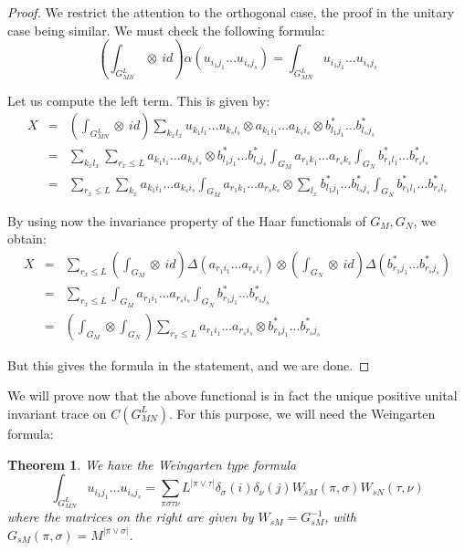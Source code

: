\documentclass[12pt]{amsbook}
\newtheorem{theorem}{Theorem}[chapter]
\begin{document}
\begin{proof}
We restrict the attention to the orthogonal case, the proof in the unitary case being similar. We must check the following formula:
$$\left(\int_{G_{MN}^L}\!\otimes\ id\right)\alpha(u_{i_1j_1}\ldots u_{i_sj_s})=\int_{G_{MN}^L}u_{i_1j_1}\ldots u_{i_sj_s}$$

Let us compute the left term. This is given by:
\begin{eqnarray*}
X
&=&\left(\int_{G_{MN}^L}\!\otimes\ id\right)\sum_{k_xl_x}u_{k_1l_1}\ldots u_{k_sl_s}\otimes a_{k_1i_1}\ldots a_{k_si_s}\otimes b_{l_1j_1}^*\ldots b_{l_sj_s}^*\\
&=&\sum_{k_xl_x}\sum_{r_x\leq L}a_{k_1i_1}\ldots a_{k_si_s}\otimes b_{l_1j_1}^*\ldots b_{l_sj_s}^*\int_{G_M}a_{r_1k_1}\ldots a_{r_sk_s}\int_{G_N}b_{r_1l_1}^*\ldots b_{r_sl_s}^*\\
&=&\sum_{r_x\leq L}\sum_{k_x}a_{k_1i_1}\ldots a_{k_si_s}\int_{G_M}a_{r_1k_1}\ldots a_{r_sk_s}
\otimes\sum_{l_x}b_{l_1j_1}^*\ldots b_{l_sj_s}^*\int_{G_N}b_{r_1l_1}^*\ldots b_{r_sl_s}^*
\end{eqnarray*}

By using now the invariance property of the Haar functionals of $G_M,G_N$, we obtain:
\begin{eqnarray*}
X
&=&\sum_{r_x\leq L}\left(\int_{G_M}\!\otimes\ id\right)\Delta(a_{r_1i_1}\ldots a_{r_si_s})
\otimes\left(\int_{G_N}\!\otimes\ id\right)\Delta(b_{r_1j_1}^*\ldots b_{r_sj_s}^*)\\
&=&\sum_{r_x\leq L}\int_{G_M}a_{r_1i_1}\ldots a_{r_si_s}\int_{G_N}b_{r_1j_1}^*\ldots b_{r_sj_s}^*\\
&=&\left(\int_{G_M}\otimes\int_{G_N}\right)\sum_{r_x\leq L}a_{r_1i_1}\ldots a_{r_si_s}\otimes b_{r_1j_1}^*\ldots b_{r_sj_s}^*
\end{eqnarray*}

But this gives the formula in the statement, and we are done.
\end{proof}

We will prove now that the above functional is in fact the unique positive unital invariant trace on $C(G_{MN}^L)$. For this purpose, we will need the Weingarten formula:


\begin{theorem}
We have the Weingarten type formula
$$\int_{G_{MN}^L}u_{i_1j_1}\ldots u_{i_sj_s}=\sum_{\pi\sigma\tau\nu}L^{|\pi\vee\tau|}\delta_\sigma(i)\delta_\nu(j)W_{sM}(\pi,\sigma)W_{sN}(\tau,\nu)$$
where the matrices on the right are given by $W_{sM}=G_{sM}^{-1}$, with $G_{sM}(\pi,\sigma)=M^{|\pi\vee\sigma|}$.
\end{theorem}
\end{document}
